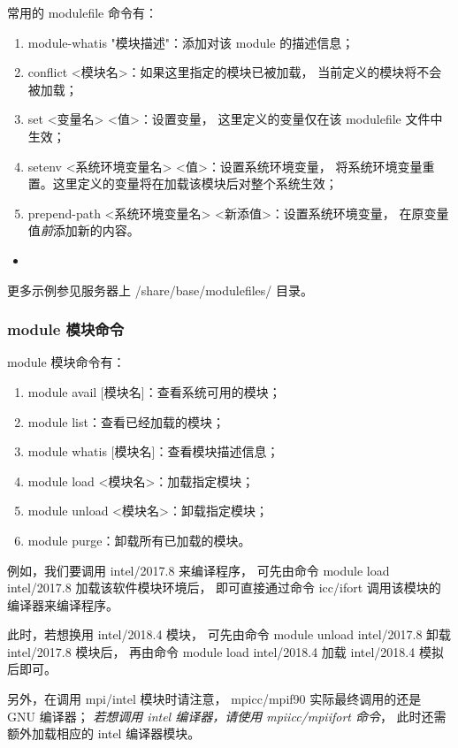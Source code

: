 \documentclass[UTF8]{ctexart}
\newcommand{\myem}[1]{{\color{red}\em #1}}
\newcommand{\mynote}[1]{\colorbox{gray!35}{#1}}
\newcommand{\mynnote}[1]{\colorbox{gray!15}{\color{blue!65}#1}}
\newcommand{\insertbash}[2]{\begin{itemize}\item[]\end{itemize}}
\begin{document}
常用的 modulefile 命令有：
\begin{enumerate}[\hspace{15mm}（1）]
  \item \mynote{module-whatis "模块描述"}：添加对该 module 的描述信息；
  \item \mynote{conflict <模块名>}：如果这里指定的模块已被加载，
    当前定义的模块将不会被加载；
  \item \mynote{set <变量名> <值>}：设置变量，
    这里定义的变量仅在该 modulefile 文件中生效；
  \item \mynote{setenv <系统环境变量名> <值>}：设置系统环境变量，
    将系统环境变量重置。这里定义的变量将在加载该模块后对整个系统生效；
  \item \mynote{prepend-path <系统环境变量名> <新添值>}：设置系统环境变量，
    在原变量值{\em 前}添加新的内容。
\end{enumerate}

\insertbash{material/module.sh}{modulefile 文件书写示例}

更多示例参见服务器上 /share/base/modulefiles/ 目录。

\subsubsection{module 模块命令}
module 模块命令有：
\begin{enumerate}[\hspace{15mm}（1）]
  \item \mynnote{module avail [模块名]}：查看系统可用的模块；
  \item \mynnote{module list}：查看已经加载的模块；
  \item \mynnote{module whatis [模块名]}：查看模块描述信息；
  \item \mynnote{module load <模块名>}：加载指定模块；
  \item \mynnote{module unload <模块名>}：卸载指定模块；
  \item \mynnote{module purge}：卸载所有已加载的模块。
\end{enumerate}

例如，我们要调用 intel/2017.8 来编译程序，
可先由命令 \mynote{module load intel/2017.8} 加载该软件模块环境后，
即可直接通过命令 icc/ifort 调用该模块的编译器来编译程序。

此时，若想换用 intel/2018.4 模块，
可先由命令 \mynote{module unload intel/2017.8} 卸载 intel/2017.8 模块后，
再由命令 \mynote{module load intel/2018.4} 加载 intel/2018.4 模拟后即可。

另外，在调用 mpi/intel 模块时请注意，
mpicc/mpif90 实际最终调用的还是 GNU 编译器；
\myem{若想调用 intel 编译器，请使用 mpiicc/mpiifort 命令}，
此时还需额外加载相应的 intel 编译器模块。
\end{document}
